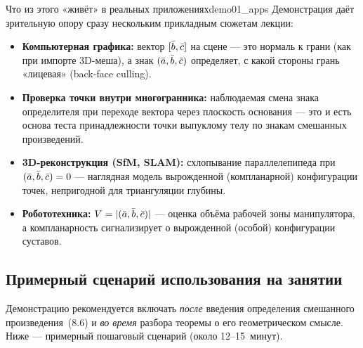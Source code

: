 \begin{remarkIT}{Что из этого «живёт» в реальных приложениях}{demo01_apps}
  Демонстрация даёт зрительную опору сразу нескольким прикладным сюжетам
  лекции:
  \begin{itemize}
    \item \textbf{Компьютерная графика:} вектор $[\bar{b},\bar{c}]$ на сцене — это
      нормаль к грани (как при импорте 3D-меша), а знак $(\bar{a},\bar{b},\bar{c})$
      определяет, с какой стороны грань «лицевая» (back-face culling).
    \item \textbf{Проверка точки внутри многогранника:} наблюдаемая смена
      знака определителя при переходе вектора через плоскость основания —
      это и есть основа теста принадлежности точки выпуклому телу по знакам
      смешанных произведений.
    \item \textbf{3D-реконструкция (SfM, SLAM):} схлопывание параллелепипеда
      при $(\bar{a},\bar{b},\bar{c})=0$ — наглядная модель вырожденной (компланарной)
      конфигурации точек, непригодной для триангуляции глубины.
    \item \textbf{Робототехника:} $V=|(\bar{a},\bar{b},\bar{c})|$ — оценка объёма рабочей
      зоны манипулятора, а компланарность сигнализирует о вырожденной
      (особой) конфигурации суставов.
  \end{itemize}
\end{remarkIT}

\subsection*{Примерный сценарий использования на занятии}

Демонстрацию рекомендуется включать \emph{после} введения определения
смешанного произведения~(8.6) и \emph{во время} разбора теоремы о его
геометрическом смысле. Ниже — примерный пошаговый сценарий (около
12--15~минут).

